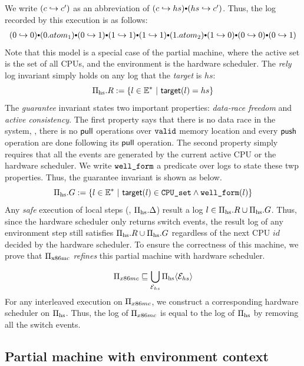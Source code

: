 \noindent
We write $(c \hookrightarrow c')$
as an abbreviation of $(c \switch hs) \cons (hs \switch c')$.
Thus,
the log recorded by this execution is as follows:
\[
\begin{array}{l}
(0\switch 0) \cons (0.atom_1)
\cons (0\switch 1) \cons (1\switch 1)
\cons  (1\switch 1) \cons (1.atom_2)
\cons (1\switch 0) \cons (0\switch 0)
\cons ( 0\switch 1)
\end{array}
\]
\noindent
Note that this model is a special case of the partial
machine,
where the 
active set is the set of all CPUs,
and the environment is the hardware scheduler.
The \emph{rely} log invariant simply holds
on any log that the \emph{target} is $hs$:
\[\mach{hs}.R := \{ l \in \Ev^* \ |\ \kw{target}(l) = hs \}\]
The \emph{guarantee} invariant states
two important properties:
\emph{data-race freedom}
and \emph{active consistency}.
The first property says
 that there is no
data race in the system,
\ie, there is no $\mathsf{pull}$ operations over ${\texttt{valid}}$
memory location and every $\mathsf{push}$ operation
are done following its $\mathsf{pull}$ operation.
The second property simply
requires that all the events
are generated by the current active CPU or the hardware scheduler.
We write ${\texttt{well\_form}}$ a predicate
over logs to state these twp properties.
Thus, the guarantee invariant is shown as below.
\[\Pi_{\text{hs}}.G := \{ l \in \mathbb{E}^* \ |\ {\mathsf{target}}(l) \in {\texttt{CPU\_set}}
\land {\texttt{well\_form}}(l) \}\]
Any \emph{safe} execution of  local steps (\ie, $\Pi_{\text{hs}}.\Delta$) result a log $l \in \Pi_{\text{hs}}.R \cup \Pi_{\text{hs}}.G$.
Thus, since the hardware scheduler only returns switch events,
the result log of any environment step still satisfies
$\Pi_{\text{hs}}.R \cup \Pi_{\text{hs}}.G$ regardless
of the next CPU $id$ decided by the hardware scheduler.
To ensure the correctness of this machine,
we prove that $\Pi_{\text{x86mc}}$ \emph{refines} this
partial machine with hardware scheduler.

\begin{lemma}
\[\Pi_{x86mc} \sqsubseteq \bigcup_{\mathcal{E}_{hs}}{
\Pi_{\text{hs}}\langle \mathcal{E}_{hs} \rangle}
\]
For any interleaved execution on $\Pi_{x86mc}$, we construct
a corresponding hardware scheduler on $\Pi_{\text{hs}}$.
Thus, the log of $\Pi_{x86mc}$
is equal to the log of $\Pi_{\text{hs}}$
by removing all the switch events.
 \label{lemma:pboot}
\end{lemma}


\subsection{Partial machine with environment context}


